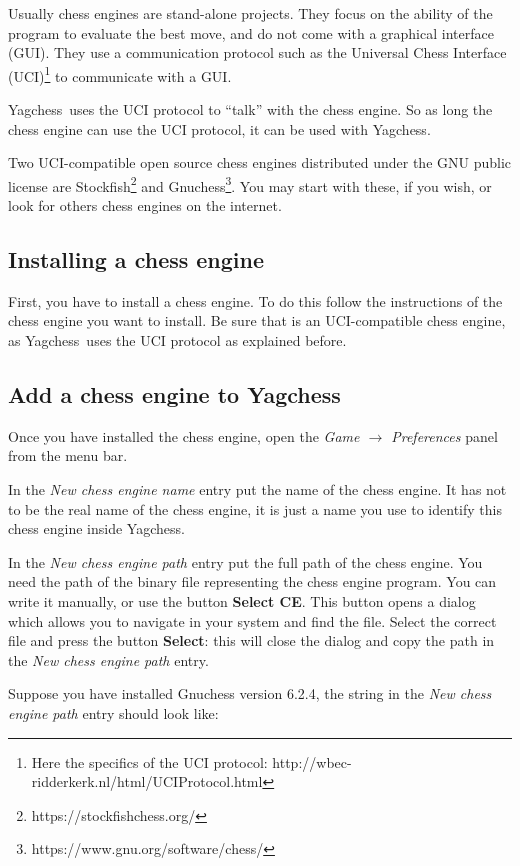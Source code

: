 \documentclass[a4paper]{article}
\newcommand{\nameprog}{Yagchess}
\begin{document}
Usually chess engines are stand-alone projects. They focus on the ability of the program to evaluate the best move, and do not come with a graphical interface (GUI).
They use a communication protocol such as the Universal Chess Interface (UCI)\footnote{Here the specifics of the UCI protocol: http://wbec-ridderkerk.nl/html/UCIProtocol.html}
to communicate with a GUI.

\nameprog\ uses the UCI protocol to ``talk'' with the chess engine. So as long the chess engine can use the UCI protocol, it can be used with \nameprog.

Two UCI-compatible open source chess engines distributed under the GNU public license are Stockfish\footnote{https://stockfishchess.org/}
and Gnuchess\footnote{https://www.gnu.org/software/chess/}. You may start with these, if you wish, or look for others chess engines on the internet.


\subsection{Installing a chess engine}
First, you have to install a chess engine. To do this follow the instructions of the chess engine you want to install. Be sure that is an UCI-compatible chess engine,
as \nameprog\ uses the UCI protocol as explained before.


\subsection{Add a chess engine to \nameprog}
Once you have installed the chess engine, open the \textit{Game $\rightarrow$ Preferences} panel from the menu bar.

In the \textit{New chess engine name} entry put the name of the chess engine. It has not to be the real name of the chess engine,
it is just a name you use to identify this chess engine inside \nameprog.

In the \textit{New chess engine path} entry put the full path of the chess engine. You need the path of the binary file representing the chess engine program.
You can write it manually, or use the button \textbf{Select CE}. This button opens a dialog which allows you to navigate in your system and find the file.
Select the correct file and press the button \textbf{Select}: this will close the dialog and copy the path in the \textit{New chess engine path} entry.

Suppose you have installed Gnuchess version 6.2.4, the string in the \textit{New chess engine path} entry should look like:
\end{document}

